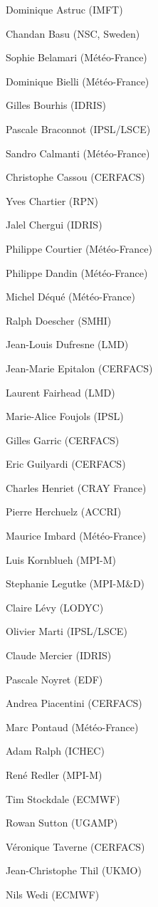 \begin{description}
  \item Dominique Astruc (IMFT)
  \item Chandan Basu (NSC, Sweden)
  \item Sophie Belamari (M\'et\'eo-France)
  \item Dominique Bielli (M\'et\'eo-France)
  \item Gilles Bourhis (IDRIS)
  \item Pascale Braconnot (IPSL/LSCE)
  \item Sandro Calmanti (M\'et\'eo-France)
  \item Christophe Cassou (CERFACS)
  \item Yves Chartier (RPN)
  \item Jalel Chergui (IDRIS)
  \item Philippe Courtier (M\'et\'eo-France)
  \item Philippe Dandin (M\'et\'eo-France)
  \item Michel D\'equ\'e (M\'et\'eo-France)
  \item Ralph Doescher (SMHI)
  \item Jean-Louis Dufresne (LMD)
  \item Jean-Marie Epitalon (CERFACS)
  \item Laurent Fairhead (LMD)
  \item Marie-Alice Foujols (IPSL)
  \item Gilles Garric (CERFACS)
  \item Eric Guilyardi (CERFACS)
  \item Charles Henriet (CRAY France)
  \item Pierre Herchuelz (ACCRI)
  \item Maurice Imbard (M\'et\'eo-France)
  \item Luis Kornblueh (MPI-M)
  \item Stephanie Legutke (MPI-M\&D)
  \item Claire L\'evy (LODYC)
  \item Olivier Marti (IPSL/LSCE)
  \item Claude Mercier (IDRIS)
  \item Pascale Noyret (EDF)
  \item Andrea Piacentini (CERFACS)
  \item Marc Pontaud (M\'et\'eo-France)
  \item Adam Ralph (ICHEC)
  \item Ren\'e Redler (MPI-M)
  \item Tim Stockdale (ECMWF)
  \item Rowan Sutton (UGAMP)
  \item V\'eronique Taverne (CERFACS)
  \item Jean-Christophe Thil (UKMO)
  \item Nils Wedi (ECMWF)
\end{description}



